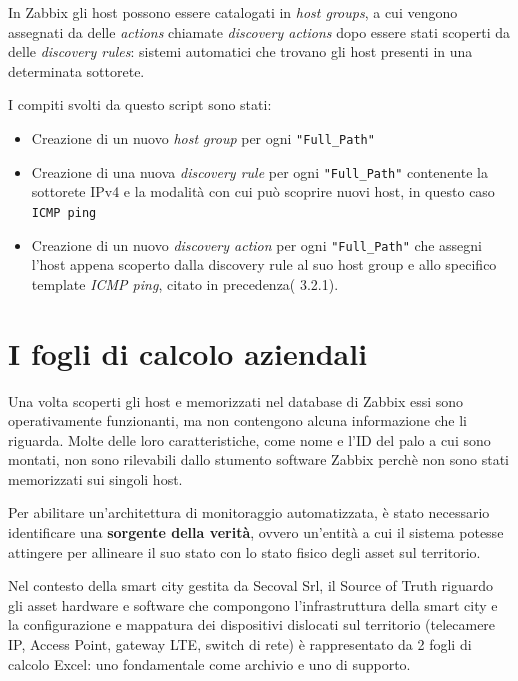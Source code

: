 \documentclass[12pt, a4paper, oneside]{report}
\begin{document}
In Zabbix gli host possono essere catalogati in \emph{host groups},
a cui vengono assegnati da delle \emph{actions} chiamate \emph{discovery actions}
dopo essere stati scoperti da delle \emph{discovery rules}: sistemi automatici
che trovano gli host presenti in una determinata sottorete.

I compiti svolti da questo script sono stati:
\begin{itemize}
    \item Creazione di un nuovo \emph{host group} per ogni \lstinline|"Full_Path"|
    \item Creazione di una nuova \emph{discovery rule} per ogni \lstinline|"Full_Path"|
          contenente la sottorete IPv4 e la modalità con cui può scoprire nuovi host,
          in questo caso \lstinline|ICMP ping|
    \item Creazione di un nuovo \emph{discovery action} per ogni \lstinline|"Full_Path"| che assegni
          l'host appena scoperto dalla discovery rule al suo host group
          e allo specifico template \emph{ICMP ping}, citato in precedenza( 3.2.1).
\end{itemize}
\section{I fogli di calcolo aziendali}
Una volta scoperti gli host e memorizzati nel database di Zabbix essi sono operativamente funzionanti, ma non contengono alcuna informazione che li riguarda.
Molte delle loro caratteristiche, come nome e l'ID del palo a cui sono montati, non
sono rilevabili dallo stumento software Zabbix perchè non sono stati memorizzati sui singoli host.

Per abilitare un'architettura di monitoraggio automatizzata, è stato necessario identificare una \textbf{sorgente della verità}, ovvero un'entità a cui il sistema potesse attingere per allineare il suo stato con lo stato fisico degli asset sul territorio.

Nel contesto della smart city gestita da Secoval Srl, il Source of Truth riguardo gli asset hardware e software che compongono l'infrastruttura della smart city e la configurazione e mappatura dei dispositivi dislocati sul territorio (telecamere IP, Access Point, gateway LTE, switch di rete) è rappresentato da 2 fogli di calcolo Excel: uno fondamentale come archivio e uno di supporto.
\end{document}
